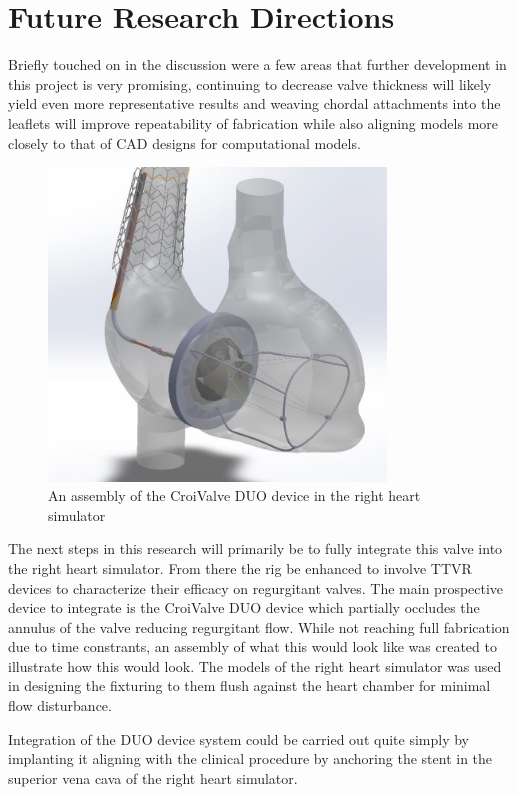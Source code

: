 \section{Future Research Directions}
Briefly touched on in the discussion were a few areas that further development in this project is very promising, continuing to decrease valve thickness will likely yield even more representative results and weaving chordal attachments into the leaflets will improve repeatability of fabrication while also aligning models more closely to that of \gls{CAD} designs for computational models.

\begin{figure}[H]
    \begin{fullwidth}
        \centering
        \includegraphics[width=0.8\textwidth]{figures/future}
        \caption{An assembly of the CroiValve DUO device in the right heart simulator}
        \label{fig:duo_assembly}
    \end{fullwidth}
\end{figure}
The next steps in this research will primarily be to fully integrate this valve into the right heart simulator. From there the rig be enhanced to involve \gls{TTVR} devices to characterize their efficacy on regurgitant valves. The main prospective device to integrate is the CroiValve DUO device which partially occludes the annulus of the valve reducing  regurgitant flow. While not reaching full fabrication due to time constrants, an assembly of what this would look like was created to illustrate how this would look. The models of the right heart simulator was used in designing the fixturing to them flush against the heart chamber for minimal flow disturbance.

Integration of the DUO device system could be carried out quite simply by implanting it aligning with the clinical procedure by anchoring the stent in the superior vena cava of the right heart simulator.

